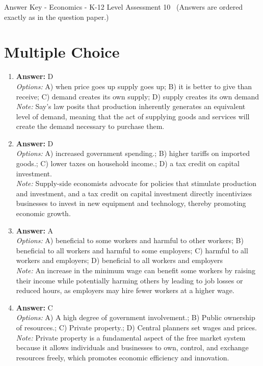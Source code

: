 \documentclass[12pt]{article}
\begin{document}
\begin{center}
Answer Key - Economics - K-12 Level Assessment 10 \
\small (Answers are ordered exactly as in the question paper.)
\end{center}

\section*{Multiple Choice}
\begin{enumerate}[label=\arabic*.]
\item \textbf{Answer:} D
\\ \textit{Options:} A) when price goes up supply goes up; B) it is better to give than receive; C) demand creates its own supply; D) supply creates its own demand
\\ \textit{Note:} Say's law posits that production inherently generates an equivalent level of demand, meaning that the act of supplying goods and services will create the demand necessary to purchase them.
\item \textbf{Answer:} D
\\ \textit{Options:} A) increased government spending.; B) higher tariffs on imported goods.; C) lower taxes on household income.; D) a tax credit on capital investment.
\\ \textit{Note:} Supply-side economists advocate for policies that stimulate production and investment, and a tax credit on capital investment directly incentivizes businesses to invest in new equipment and technology, thereby promoting economic growth.
\item \textbf{Answer:} A
\\ \textit{Options:} A) beneficial to some workers and harmful to other workers; B) beneficial to all workers and harmful to some employers; C) harmful to all workers and employers; D) beneficial to all workers and employers
\\ \textit{Note:} An increase in the minimum wage can benefit some workers by raising their income while potentially harming others by leading to job losses or reduced hours, as employers may hire fewer workers at a higher wage.
\item \textbf{Answer:} C
\\ \textit{Options:} A) A high degree of government involvement.; B) Public ownership of resources.; C) Private property.; D) Central planners set wages and prices.
\\ \textit{Note:} Private property is a fundamental aspect of the free market system because it allows individuals and businesses to own, control, and exchange resources freely, which promotes economic efficiency and innovation.

\end{enumerate}
\end{document}

